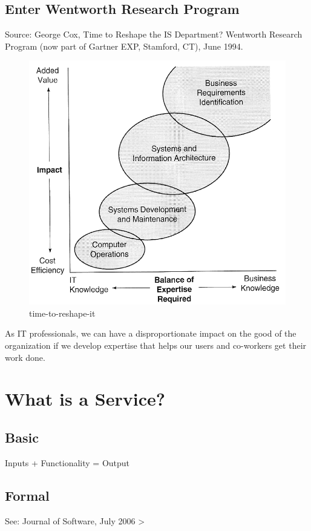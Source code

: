 \documentclass{article}
\begin{document}
\subsection{Enter Wentworth Research Program}
Source: George Cox, Time to Reshape the IS Department? Wentworth Research Program (now part of Gartner EXP, Stamford, CT), June 1994.



\begin{figure}
\includegraphics{time-to-reshape-it.png}
\caption{time-to-reshape-it}
\label{fig:att2}
\end{figure}
As IT professionals, we can have a disproportionate impact on the good of the organization if we develop expertise that helps our users and co-workers get their work done.

\section{What is a Service?}
\subsection{Basic}
Inputs + Functionality = Output

\subsection{Formal}
See: Journal of Software, July 2006 > 
\end{document}

